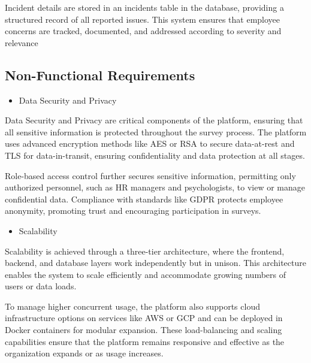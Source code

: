 \documentclass[conference]{IEEEtran}
\begin{document}
            Incident details are stored in an incidents
            table in the database, providing a structured record of all 
            reported issues. This system ensures that employee concerns are 
            tracked, documented, and addressed according to severity and 
            relevance
            \newline  
    
        \subsection {Non-Functional Requirements}
   
        \begin{itemize}
            \item Data Security and Privacy
        \end{itemize}
    
        Data Security and Privacy are critical components of the platform, 
        ensuring that all sensitive information is protected throughout the 
        survey process. The platform uses advanced encryption methods like 
        AES or RSA to secure data-at-rest and TLS for data-in-transit, 
        ensuring confidentiality and data protection at all stages. 
        \newline
    
        Role-based access control further secures sensitive information, 
        permitting only authorized personnel, such as HR managers and 
        psychologists, to view or manage confidential data. Compliance with
        standards like GDPR protects employee anonymity, promoting trust 
        and encouraging participation in surveys.
        \newline    

        \begin{itemize}
            \item Scalability
        \end{itemize}
    
        Scalability is achieved through a three-tier architecture, where the 
        frontend, backend, and database layers work independently but in 
        unison. This architecture enables the system to scale efficiently 
        and accommodate growing numbers of users or data loads. 
        \newline
    
        To manage higher concurrent usage, the platform also supports cloud 
        infrastructure options on services like AWS or GCP and can be 
        deployed in Docker containers for modular expansion. These 
        load-balancing and scaling capabilities ensure that the platform 
        remains responsive and effective as the organization expands or as 
        usage increases.
        \newline    
\end{document}
